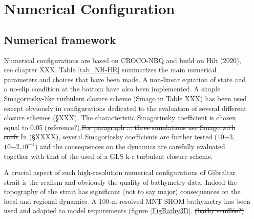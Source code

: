 \section{Numerical Configuration}
\label{section3Dnum}

\subsection{Numerical framework}

\color{blue}Numerical configurations are based on \color{black} CROCO-NBQ and build on Hilt (2020), see chapter XXX. \color{black} Table \ref{tab_NH-HR} summarizes \color{blue} the main numerical parameters and choices that have been made. A non-linear equation of state and a no-slip condition at the bottom have also been implemented. \color{blue} A simple Smagorinsky-like turbulent closure scheme (Smago in Table XXX) has been used except obviously in configurations dedicated to the evaluation of several different closure schemes (\S XXX). The characteristic Smagorinsky coefficient is chosen equal to 0.05 (reference?).\sout{For paragraph ... three simulations use Smago with coefs} In (\S XXXX), several Smagorinsky coefficients are further tested  ($10{-3}$,$10{-2}$,$10^{-1}$) and the consequences on the dynamics are carefully evaluated together with that of the used of a GLS k-$\epsilon$ turbulent closure scheme. \color{black}

\color{blue}A crucial aspect of such high-resolution numerical configurations of Gibraltar strait is the realism and obviously the quality of bathymetry data. Indeed the topography of the strait has significant (not to say major) consequences on the local and regional dynamics. A 100-m-resolved MNT SHOM bathymetry has been used and adapted to model requirements (figure \ref{FigBathy3D}. \sout{(bathy seuillée?)} \color{black}


